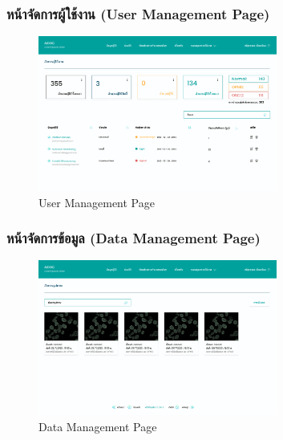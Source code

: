 \subsubsection{หน้าจัดการผู้ใช้งาน (User Management Page)}
\begin{figure}[h]
    \begin{center}
        \includegraphics[width=0.7\textwidth]{img/admin/2-admin-user-management-page.png}
    \end{center}
    \caption[Poem]{User Management Page}
    \label{fig:user_management}
\end{figure}

\newpage
\subsubsection{หน้าจัดการข้อมูล (Data Management Page)}
\begin{figure}[h]
    \begin{center}
        \includegraphics[width=0.7\textwidth]{img/admin/3-admin-image-manamgement.png}
    \end{center}
    \caption[Poem]{Data Management Page}
    \label{fig:data_management}
\end{figure}

